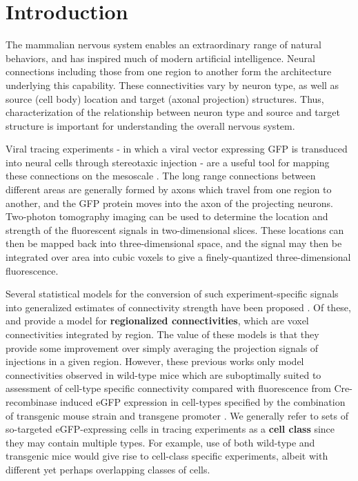 \section{Introduction}
 
The mammalian nervous system enables an extraordinary range of natural behaviors, and has inspired much of modern artificial intelligence.
Neural connections including those from one region to another form the architecture underlying this capability.
These connectivities vary by neuron type, as well as source (cell body) location and target (axonal projection) structures.
Thus, characterization of the relationship between neuron type and source and target structure is important for understanding the overall nervous system.

Viral tracing experiments - in which a viral vector expressing GFP is transduced into neural cells through stereotaxic injection - are a useful tool for mapping these connections on the mesoscale \citep{Chamberlin1998-hi,Harris2012-fw, Daigle2018-gd}.
The long range connections between different areas are generally formed by axons which travel from one region to another, and the GFP protein moves into the axon of the projecting neurons.
Two-photon tomography imaging can be used to determine the location and strength of the fluorescent signals in two-dimensional slices.
These locations can then be mapped back into three-dimensional space, and the signal may then be integrated over area into cubic voxels to give a finely-quantized three-dimensional fluorescence.

Several statistical models for the conversion of such experiment-specific signals into generalized estimates of connectivity strength have been proposed \citep{Oh2014-kh, Harris2016-fn, Gamanut2018-sd, Knox2019-ot}.
Of these, \citet{Oh2014-kh} and \citet{Knox2019-ot} provide a model for \textbf{regionalized connectivities}, which are voxel connectivities integrated by region.
The value of these models is that they provide some improvement over simply averaging the projection signals of injections in a given region.
However, these previous works only model connectivities observed in wild-type mice which are suboptimally suited to assessment of cell-type specific connectivity compared with fluorescence from Cre-recombinase induced eGFP expression in cell-types specified by the combination of transgenic mouse strain and transgene promoter \citep{Harris2019-mr}.
We generally refer to sets of so-targeted eGFP-expressing cells in tracing experiments as a \textbf{cell class} since they may contain multiple types.
For example, use of both wild-type and transgenic mice would give rise to cell-class specific experiments, albeit with different yet perhaps overlapping classes of cells.

